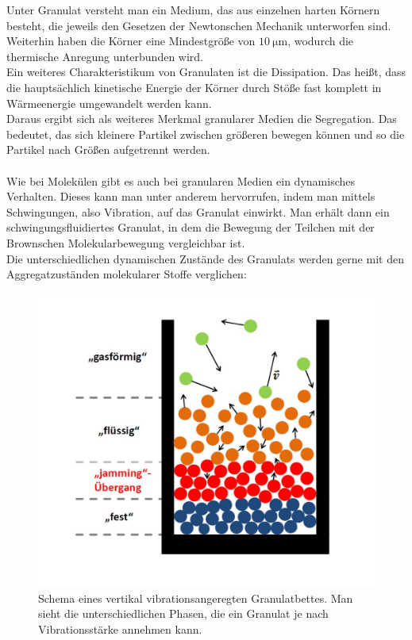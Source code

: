 Unter Granulat versteht man ein Medium, das aus einzelnen harten Körnern besteht, die jeweils den Gesetzen der Newtonschen Mechanik unterworfen sind. Weiterhin haben die Körner eine Mindestgröße von $\SI{10}{\micro\meter}$, wodurch die thermische Anregung unterbunden wird. \\
Ein weiteres Charakteristikum von Granulaten ist die Dissipation. Das heißt, dass die hauptsächlich kinetische Energie der Körner durch Stöße fast komplett in Wärmeenergie umgewandelt werden kann. \cite{DLRWebsite} \\
Daraus ergibt sich als weiteres Merkmal granularer Medien die Segregation. Das bedeutet, das sich kleinere Partikel zwischen größeren bewegen können und so die Partikel nach Größen aufgetrennt werden. \cite{PhysikimKontext} \\
\hfill \\ 
Wie bei Molekülen gibt es auch bei granularen Medien ein dynamisches Verhalten. Dieses kann man unter anderem hervorrufen, indem man mittels Schwingungen, also Vibration, auf das Granulat einwirkt. Man erhält dann ein schwingungsfluidiertes Granulat, in dem die Bewegung der Teilchen mit der Brownschen Molekularbewegung vergleichbar ist. \\
Die unterschiedlichen dynamischen Zustände des Granulats werden gerne mit den Aggregatzuständen molekularer Stoffe verglichen:


\begin{center}
\begin{figure}[h]
	\includegraphics[scale=0.45]{Einleitung_1.jpg}
	\caption[Phasen im Wirbelbett]{Schema eines vertikal vibrationsangeregten Granulatbettes. Man sieht die unterschiedlichen Phasen, die ein Granulat je nach Vibrationsstärke annehmen kann. \cite{Darmstadt2015}}
\end{figure}	
\end{center}


